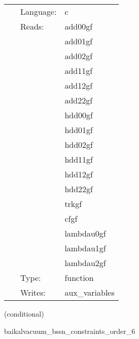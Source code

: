 \hspace{5mm}{\it compute bssn (hamiltonian and momentum) constraints, at finite-differencing order 4 } 


\hspace{5mm}

 \begin{tabular*}{160mm}{cll} 
~ & Language:  & c \\ 
~ & Reads:  & add00gf \\ 
~& ~ &add01gf\\ 
~& ~ &add02gf\\ 
~& ~ &add11gf\\ 
~& ~ &add12gf\\ 
~& ~ &add22gf\\ 
~& ~ &hdd00gf\\ 
~& ~ &hdd01gf\\ 
~& ~ &hdd02gf\\ 
~& ~ &hdd11gf\\ 
~& ~ &hdd12gf\\ 
~& ~ &hdd22gf\\ 
~& ~ &trkgf\\ 
~& ~ &cfgf\\ 
~& ~ &lambdau0gf\\ 
~& ~ &lambdau1gf\\ 
~& ~ &lambdau2gf\\ 
~ & Type:  & function \\ 
~ & Writes:  & aux\_variables \\ 
\end{tabular*} 


\vspace{5mm}

   (conditional) 

\hspace{5mm} baikalvacuum\_bssn\_constraints\_order\_6 

\hspace{5mm}{\it compute bssn (hamiltonian and momentum) constraints, at finite-differencing order 6 } 


\hspace{5mm}

